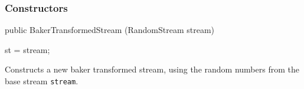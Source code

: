 \subsubsection* {Constructors}

\begin{code}

   public BakerTransformedStream (RandomStream stream) \begin{hide} {
      st = stream;
   } \end{hide}
\end{code}
\begin{tabb} Constructs a new baker transformed stream, using the random
  numbers from the base stream \texttt{stream}.
\end{tabb}

